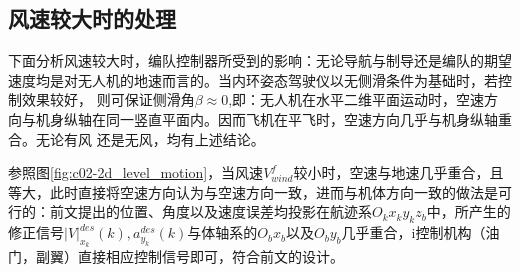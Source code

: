 \subsection{风速较大时的处理} 
下面分析风速较大时，编队控制器所受到的影响：无论导航与制导还是编队的期望速度均是对无人机的地速而言的。当内环姿态驾驶仪以无侧滑条件为基础时，若控制效果较好，
则可保证侧滑角$\beta\approx 0$,即：无人机在水平二维平面运动时，空速方向与机身纵轴在同一竖直平面内。因而飞机在平飞时，空速方向几乎与机身纵轴重合。无论有风
还是无风，均有上述结论。

参照图\ref{fig:c02-2d_level_motion}，当风速$V_{wind}^f$较小时，空速与地速几乎重合，且等大，此时直接将空速方向认为与空速方向一致，进而与机体方向一致的做法是可行的：前文提出的位置、角度以及速度误差均投影在航迹系$O_kx_ky_kz_b$中，所产生的修正信号$|V|_{x_k}^{des}(k),a_{y_k}^{des}(k)$与体轴系的$O_bx_b$以及$O_by_b$几乎重合，i控制机构（油门，副翼）直接相应控制信号即可，符合前文的设计。

